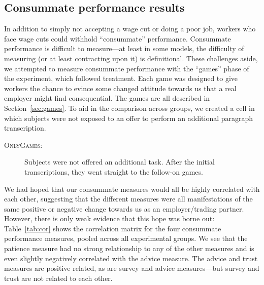 \documentclass[11pt]{article}
\begin{document}
\subsection{Consummate performance results} 
In addition to simply not accepting a wage cut or doing a poor job, workers who face wage cuts could withhold ``consummate'' performance. 
Consummate performance is difficult to measure---at least in some models, the difficulty of measuring (or at least contracting upon it) is definitional.
These challenges aside, we attempted to measure consummate performance with the ``games'' phase of the experiment, which followed treatment.
Each game was designed to give workers the chance to evince some changed attitude towards us that a real employer might find consequential. 
The games are all described in Section~\ref{sec:games}. 
To aid in the comparison across groups, we created a cell in which subjects were not exposed to an offer to perform an additional paragraph transcription. 
\begin{description}   
\item[\textsc{OnlyGames}:] Subjects were not offered an additional task.
  After the initial transcriptions, they went straight to the follow-on games.
\end{description}
We had hoped that our consummate measures would all be highly correlated with each other, suggesting that the different measures were all manifestations of the same positive or negative change towards us as an employer/trading partner. 
However, there is only weak evidence that this hope was borne out: 
Table~\ref{tab:cor} shows the correlation matrix for the four consummate performance measures, pooled across all experimental groups.
We see that the patience measure had no strong relationship to any of the other measures and is even slightly negatively correlated with the advice measure.
The advice and trust measures are positive related, as are survey and advice measures---but survey and trust are not related to each other. 


\end{document}
